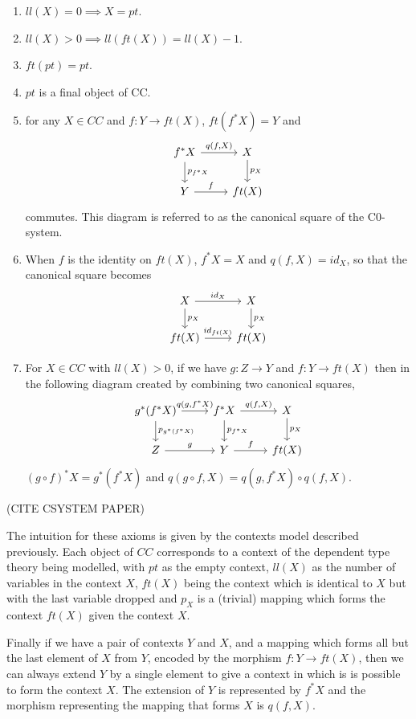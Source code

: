 \begin{enumerate}
    \item $ll(X) = 0 \implies X=pt$.
    \item $ll(X) > 0 \implies ll(ft(X)) = ll(X) - 1$.
    \item $ft(pt) = pt$.
    \item $pt$ is a final object of CC.
    \item for any $X\in CC$ and $f: Y\to ft(X)$, $ft(f^*X)=Y$ and
    \[
    \begin{tikzcd}
        f^*X\ar[r,"{q(f,X)}"]\ar[d,"p_{f^*X}"]&X\ar[d,"p_X"] \\
        Y\ar[r,"f"]&ft(X)
    \end{tikzcd}
    \]
    commutes. This diagram is referred to as the canonical square of the
    C0-system.
    \item When $f$ is the identity on $ft(X)$, $f^*X = X$ and $q(f, X) = id_X$,
    so that the canonical square becomes
    \[
    \begin{tikzcd}
        X\ar[r,"id_X"]\ar[d,"p_X"]&X\ar[d,"p_X"] \\
        ft(X)\ar[r,"id_{ft(X)}"]&ft(X)
    \end{tikzcd}
    \]
    \item For $X\in CC$ with $ll(X)>0$, if we have $g:Z\to Y$ and $f:Y\to ft(X)$
    then in the following diagram created by combining two canonical squares,
    \[
    \begin{tikzcd}
        g^*(f^*X)\ar[r,"{q(g, f^*X)}"]\ar[d,"p_{g^*(f^*X)}"]&
        f^*X\ar[r,"{q(f,X)}"]\ar[d,"p_{f^*X}"]&
        X\ar[d,"p_X"] \\
        Z\ar[r,"g"]&
        Y\ar[r,"f"]&
        ft(X)
    \end{tikzcd}
    \]
    $(g\circ f)^*X = g^*(f^*X)$ and $q(g\circ f, X) = q(g, f^*X)\circ q(f, X)$.
\end{enumerate}

(CITE CSYSTEM PAPER)

The intuition for these axioms is given by the contexts model described
previously. Each object of $CC$ corresponds to a context of the dependent type
theory being modelled, with $pt$ as the empty context, $ll(X)$ as the number of
variables in the context $X$, $ft(X)$ being the context which is identical to
$X$ but with the last variable dropped and $p_X$ is a (trivial) mapping which
forms the context $ft(X)$ given the context $X$.

Finally if we have a pair of contexts $Y$ and $X$, and a mapping which forms all
but the last element of $X$ from $Y$, encoded by the morphism $f: Y\to ft(X)$,
then we can always extend $Y$ by a single element to give a context in which is
is possible to form the context $X$. The extension of $Y$ is represented by
$f^*X$ and the morphism representing the mapping that forms $X$ is $q(f, X)$.

